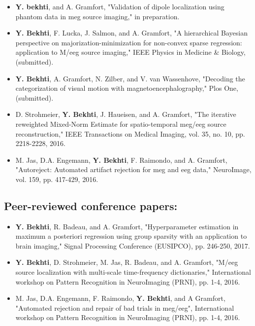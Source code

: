 \begin{itemize}
\item \textbf{Y. bekhti}, and A. Gramfort, "Validation of dipole localization using phantom data in \ac{meg} source imaging," in preparation.
\item \textbf{Y. Bekhti}, F. Lucka, J. Salmon, and A. Gramfort, "A hierarchical Bayesian perspective on majorization-minimization for non-convex sparse regression: application to M/\ac{eeg} source imaging," IEEE Physics in Medicine \& Biology, (submitted).
\item \textbf{Y. Bekhti}, A. Gramfort, N. Zilber, and V. van Wassenhove, "Decoding the categorization of visual motion with magnetoencephalography," Plos One, (submitted).
\item D. Strohmeier, \textbf{Y. Bekhti}, J. Haueisen, and A. Gramfort, "The iterative reweighted Mixed-Norm Estimate for spatio-temporal \ac{meg}/\ac{eeg} source reconstruction," IEEE Transactions on Medical Imaging, vol. 35, no. 10, pp. 2218-2228, 2016.
\item M. Jas, D.A. Engemann, \textbf{Y. Bekhti}, F. Raimondo, and A. Gramfort, "Autoreject: Automated artifact rejection for \ac{meg} and \ac{eeg} data," NeuroImage, vol. 159, pp. 417-429, 2016.
\end{itemize}

\subsection*{Peer-reviewed conference papers:}
\begin{itemize}
\item \textbf{Y. Bekhti}, R. Badeau, and A. Gramfort, "Hyperparameter estimation in maximum a posteriori regression using group sparsity with an application to brain imaging," Signal Processing Conference (EUSIPCO), pp. 246-250, 2017.
\item \textbf{Y. Bekhti}, D. Strohmeier, M. Jas, R. Badeau, and A. Gramfort, "M/\ac{eeg} source localization with multi-scale time-frequency dictionaries," International workshop on Pattern Recognition in NeuroImaging (PRNI), pp. 1-4, 2016.
\item M. Jas, D.A. Engemann, F. Raimondo, \textbf{Y. Bekhti}, and A Gramfort, "Automated rejection and repair of bad trials in \ac{meg}/\ac{eeg}", International workshop on Pattern Recognition in NeuroImaging (PRNI), pp. 1-4, 2016.
\end{itemize}

